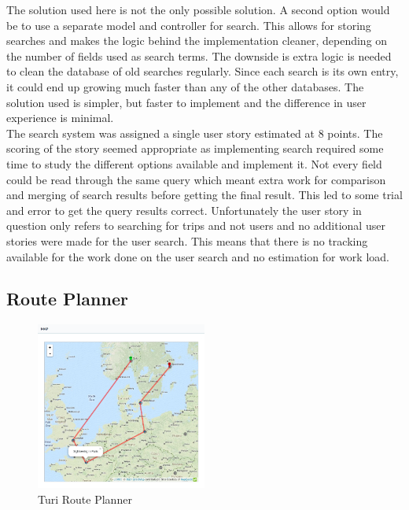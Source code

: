 \documentclass[a4paper]{article}
\begin{document}
\noindent
The solution used here is not the only possible solution. A second option would be to use a separate model and controller for search. This allows for storing searches and makes the logic behind the implementation cleaner, depending on the number of fields used as search terms. The downside is extra logic is needed to clean the database of old searches regularly. Since each search is its own entry, it could end up growing much faster than any of the other databases. The solution used is simpler, but faster to implement and the difference in user experience is minimal.\\

\noindent
The search system was assigned a single user story estimated at 8 points. The scoring of the story seemed appropriate as implementing search required some time to study the different options available and implement it. Not every field could be read through the same query which meant extra work for comparison and merging of search results before getting the final result. This led to some trial and error to get the query results correct. Unfortunately the user story in question only refers to searching for trips and not users and no additional user stories were made for the user search. This means that there is no tracking available for the work done on the user search and no estimation for work load.


\subsection{Route Planner}

\begin{figure}[!h]
  \begin{center}
    \includegraphics[width=0.5\textwidth]{pictures/route_planning}
  \end{center}
\caption{Turi Route Planner}
\label{fig:route}
\end{figure}
\end{document}
